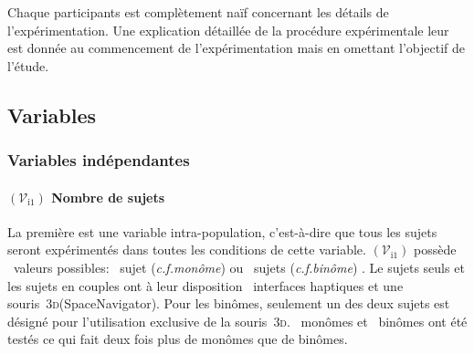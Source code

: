 \documentclass[myfrancais]{mythesis}
\newcommand{\mynum}[1]{\nombre{#1}}
\newcommand{\myvar}[2]{$\left(\mathcal{V}_{\mathrm{#1}#2}\right)$\xspace}
\newcommand{\myvari}[1]{\myvar{i}{#1}}
\newcommand{\myemph}[1]{\emph{#1}}
\newcommand{\myThreeD}{\textsc{3d}\xspace}
\newcommand{\myregistered}{\textsuperscript{\textregistered}}
\newcommand{\mySpaceNavigator}{SpaceNavigator\myregistered\xspace}
\newcommand{\mycf}{\textit{c.f.}\xspace}
\begin{document}
	Chaque participants est complètement naïf concernant les détails de l'expérimentation.
	Une explication détaillée de la procédure expérimentale leur est donnée au commencement de l'expérimentation mais en omettant l'objectif de l'étude.

	\subsection{Variables}
	\subsubsection{Variables indépendantes}
	\paragraph{\myvari{1} Nombre de sujets}
	La première  est une variable intra-population, c'est-à-dire que tous les sujets seront expérimentés dans toutes les conditions de cette variable.
	\myvari{1} possède \mynum{2}~valeurs possibles: \og \mynum{1}~sujet (\mycf \myemph{monôme}) \fg ou \og \mynum{2}~sujets (\mycf \myemph{binôme}) \fg.
	Le sujets seuls et les sujets en couples ont à leur disposition \mynum{2}~interfaces haptiques et une souris~\myThreeD (\mySpaceNavigator).
	Pour les binômes, seulement un des deux sujets est désigné pour l'utilisation exclusive de la souris~\myThreeD.
	\mynum{24}~monômes et \mynum{12}~binômes ont été testés ce qui fait deux fois plus de monômes que de binômes.
\end{document}
